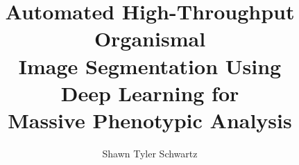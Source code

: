 \title          {Automated High-Throughput Organismal \\
                Image Segmentation Using \\
                Deep Learning for \\ Massive Phenotypic Analysis}
\author         {Shawn Tyler Schwartz}


